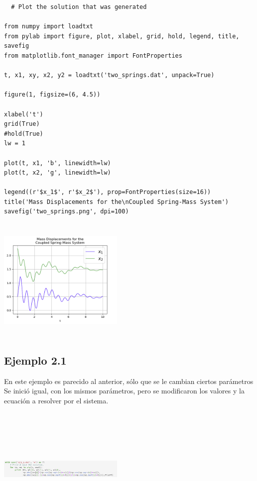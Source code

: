 \documentclass{article}
\begin{document}
\begin{verbatim}
  # Plot the solution that was generated

from numpy import loadtxt
from pylab import figure, plot, xlabel, grid, hold, legend, title, savefig
from matplotlib.font_manager import FontProperties

t, x1, xy, x2, y2 = loadtxt('two_springs.dat', unpack=True)

figure(1, figsize=(6, 4.5))

xlabel('t')
grid(True)
#hold(True)
lw = 1

plot(t, x1, 'b', linewidth=lw)
plot(t, x2, 'g', linewidth=lw)

legend((r'$x_1$', r'$x_2$'), prop=FontProperties(size=16))
title('Mass Displacements for the\nCoupled Spring-Mass System')
savefig('two_springs.png', dpi=100)
\end{verbatim}

\begin{center}
  \includegraphics[width=6cm, height=6cm]{ejgraf.png}
\end{center}

\subsection{Ejemplo 2.1}

En este ejemplo es parecido al anterior, sólo que se le cambian ciertos parámetros 
Se inició igual, con los mismos parámetros, pero se modificaron los valores y la ecuación a resolver por el sistema.

\begin{center}
  \includegraphics[width=6cm, height=6cm]{dat1.png}
\end{center}
\end{document}
